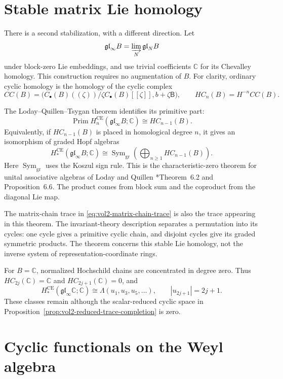 \section{Stable matrix Lie homology}
\label{sec:vol2-stable-lie-homology}

There is a second stabilization, with a different direction.
Let
\[
 \mathfrak{gl}_\infty B=\varinjlim_N\mathfrak{gl}_N B
\]
under block-zero Lie embeddings, and use trivial
coefficients $\mathbb C$ for its Chevalley homology.
This construction requires no augmentation of $B$.
For clarity, ordinary cyclic homology is the homology
of the cyclic complex
\[
 CC(B)=
 \bigl(C_\bullet(B)((\zeta))/\zeta C_\bullet(B)[[\zeta]],
       b+\zeta\mathsf B\bigr),
 \qquad HC_n(B)=H^{-n}CC(B).
\]

The Loday--Quillen--Tsygan theorem identifies its
primitive part:
\[
 \operatorname{Prim}H_n^{\mathrm{CE}}(\mathfrak{gl}_\infty B;\mathbb C)
 \cong HC_{n-1}(B).
\]
Equivalently, if $HC_{n-1}(B)$ is placed in homological
degree $n$, it gives an isomorphism of graded Hopf algebras
\begin{equation}\label{eq:vol2-lqt-hopf}
 H_*^{\mathrm{CE}}(\mathfrak{gl}_\infty B;\mathbb C)
 \cong
 \operatorname{Sym}_{\mathrm{gr}}
       \left(\bigoplus_{n\geq1}HC_{n-1}(B)\right).
\end{equation}
Here $\operatorname{Sym}_{\mathrm{gr}}$ uses the Koszul
sign rule. This is the characteristic-zero theorem for
unital associative algebras of Loday and Quillen
\cite{LodayQuillen1984}*{Theorem~6.2 and Proposition~6.6}.
The product comes from block sum and the coproduct
from the diagonal Lie map.

The matrix-chain trace in
\eqref{eq:vol2-matrix-chain-trace} is also the trace
appearing in this theorem. The invariant-theory
description separates a permutation into its cycles:
one cycle gives a primitive cyclic chain, and disjoint
cycles give its graded symmetric products.
The theorem concerns this stable Lie homology, not the
inverse system of representation-coordinate rings.

For $B=\mathbb C$, normalized Hochschild chains are
concentrated in degree zero. Thus $HC_{2j}(\mathbb C)=\mathbb C$
and $HC_{2j+1}(\mathbb C)=0$, and
\[
 H_*^{\mathrm{CE}}(\mathfrak{gl}_\infty\mathbb C;\mathbb C)
 \cong\Lambda(u_1,u_3,u_5,\ldots),\qquad |u_{2j+1}|=2j+1.
\]
These classes remain although the scalar-reduced cyclic
space in Proposition~\ref{prop:vol2-reduced-trace-completion}
is zero.

\section{Cyclic functionals on the Weyl algebra}
\label{sec:vol2-weyl-cyclic-functional}

